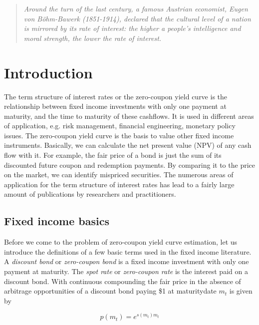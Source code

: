 
\begin{quote}
\emph{
  Around the turn of the last century, a famous Austrian economist, Eugen von B\"{o}hm-Bawerk (1851-1914), declared that the cultural level of a nation is  mirrored by its rate of interest: the higher a people's intelligence and moral strength, the lower the rate of interest.}
\\
\end{quote}


\section{Introduction}


The term structure of interest rates or the zero-coupon yield curve is the relationship between fixed income investments with only one payment at maturity, and the time to maturity of these cashflows. It is used in different areas of application, e.g. risk management, financial engineering, monetary policy issues. The zero-coupon yield curve is the basis to value other fixed income instruments. Basically, we can calculate the net present value (NPV) of any cash flow with it. For example, the fair price of a bond is just the sum of its discounted future coupon and redemption payments. By comparing it to the price on the market, we can identify mispriced securities. The numerous areas of application for the term structure of interest rates has lead to a fairly large amount of publications by researchers and practitioners.

\subsection{Fixed income basics}

Before we come to the problem of zero-coupon yield curve estimation, let us introduce the definitions of a few basic terms used in the fixed income literature. A \emph{discount bond} or \emph{zero-coupon bond} is a fixed income investment with only one payment at maturity. The \emph{spot rate} or \emph{zero-coupon rate} is the interest paid on a discount bond. With continuous compounding the fair price in the absence of arbitrage opportunities of a discount bond paying \$1 at maturitydate  $m_t$ is given by

\begin{equation}
  \label{eq:pricediscountbond}
  p(m_t)=e^{s(m_t)m_t}
\end{equation}

